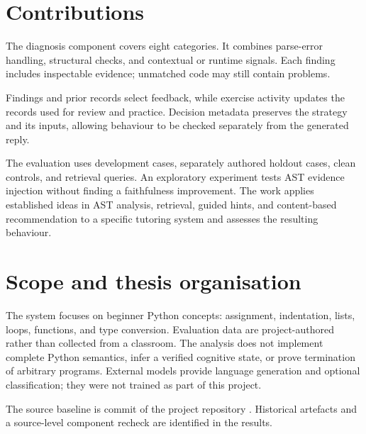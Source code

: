 \section{Contributions}
The diagnosis component covers eight categories. It combines parse-error handling, structural checks, and contextual or runtime signals. Each finding includes inspectable evidence; unmatched code may still contain problems.

Findings and prior records select feedback, while exercise activity updates the records used for review and practice. Decision metadata preserves the strategy and its inputs, allowing behaviour to be checked separately from the generated reply.

The evaluation uses development cases, separately authored holdout cases, clean controls, and retrieval queries. An exploratory experiment tests AST evidence injection without finding a faithfulness improvement. The work applies established ideas in AST analysis, retrieval, guided hints, and content-based recommendation to a specific tutoring system and assesses the resulting behaviour.

\section{Scope and thesis organisation}
The system focuses on beginner Python concepts: assignment, indentation, lists, loops, functions, and type conversion. Evaluation data are project-authored rather than collected from a classroom. The analysis does not implement complete Python semantics, infer a verified cognitive state, or prove termination of arbitrary programs. External models provide language generation and optional classification; they were not trained as part of this project.

The source baseline is commit  of the project repository \citep{pytutorrepo}. Historical artefacts and a source-level component recheck are identified in the results.
